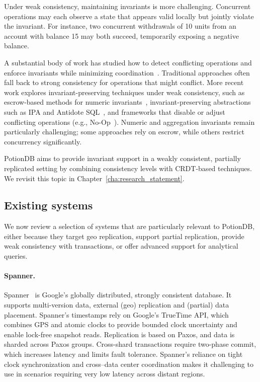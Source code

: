 Under weak consistency, maintaining invariants is more challenging. Concurrent
operations may each observe a state that appears valid locally but jointly
violate the invariant. For instance, two concurrent withdrawals of 10 units from
an account with balance 15 may both succeed, temporarily exposing a negative
balance.

A substantial body of work has studied how to detect conflicting operations and
enforce invariants while minimizing coordination~\cite{avoidence,ipa,burckhardt2014principles,novakovic2013owntheconsistency,escrow,escrow2,no-op}.
Traditional approaches often fall back to strong consistency for operations that
might conflict. More recent work explores invariant-preserving techniques under
weak consistency, such as escrow-based methods for numeric invariants~\cite{escrow,escrow2},
invariant-preserving abstractions such as IPA and Antidote SQL~\cite{ipa,antidotesql},
and frameworks that disable or adjust conflicting operations (e.g., No-Op~\cite{no-op}).
Numeric and aggregation invariants remain particularly challenging; some
approaches rely on escrow, while others restrict concurrency significantly.

PotionDB aims to provide invariant support in a weakly consistent, partially
replicated setting by combining consistency levels with CRDT-based techniques.
We revisit this topic in Chapter~\ref{cha:research_statement}.

\subsection{Existing systems}
\label{sec:existing-systems}

We now review a selection of systems that are particularly relevant to PotionDB,
either because they target geo replication, support partial replication, provide
weak consistency with transactions, or offer advanced support for analytical
queries.

\paragraph{Spanner.}

Spanner~\cite{spanner} is Google’s globally distributed, strongly consistent
database. It supports multi-version data, external (geo) replication and
(partial) data placement. Spanner’s timestamps rely on Google’s TrueTime API,
which combines GPS and atomic clocks to provide bounded clock uncertainty and
enable lock-free snapshot reads. Replication is based on Paxos, and data is
sharded across Paxos groups. Cross-shard transactions require two-phase commit,
which increases latency and limits fault tolerance. Spanner’s reliance on tight
clock synchronization and cross–data center coordination makes it challenging to
use in scenarios requiring very low latency across distant regions.

